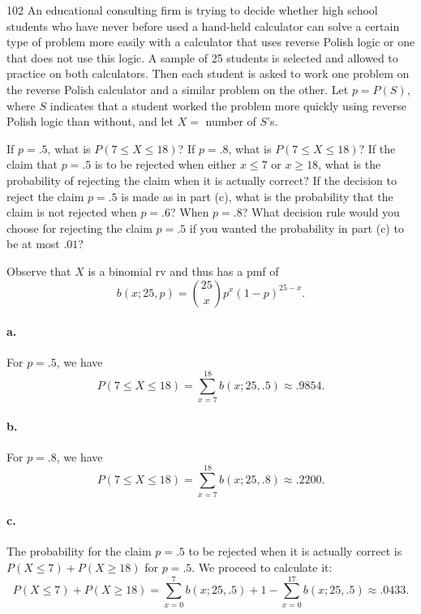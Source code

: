 \documentclass{exam}
\begin{document}
\begin{problem}{102}
	An educational consulting firm is trying to decide whether high school students who have never before used a hand-held calculator can solve a certain type of problem more easily with a calculator that uses reverse Polish logic or one that does not use this logic. A sample of 25 students is selected and allowed to practice on both calculators. Then each student is asked to work one problem on the reverse Polish calculator and a similar problem on the other. Let $p = P(S)$, where $S$ indicates that a student worked the problem more quickly using reverse Polish logic than without, and let $X =$ number of $S$'s.
	\begin{tasks}[label=\textbf{\alph*.}]
		\task If $p = .5$, what is $P(7 \le X \le 18)$?
		\task If $p = .8$, what is $P(7 \le X \le 18)$?
		\task If the claim that $p = .5$ is to be rejected when either $x \le 7$ or $x \ge 18$, what is the probability of rejecting the claim when it is actually correct?
		\task If the decision to reject the claim $p = .5$ is made as in part (c), what is the probability that the claim is not rejected when $p = .6$? When $p = .8$?
		\task What decision rule would you choose for rejecting the claim $p = .5$ if you wanted the probability in part (c) to be at most $.01$?
	\end{tasks}
\end{problem}

Observe that $X$ is a binomial rv and thus has a pmf of
\[
	b(x; 25, p) = \binom{25}x p^x (1 - p)^{25 - x}.
\]

\paragraph{a.} For $p = .5$, we have
\[
	P(7 \le X \le 18) = \sum_{x = 7}^{18} b(x; 25, .5) \approx .9854.
\]

\paragraph{b.} For $p = .8$, we have
\[
	P(7 \le X \le 18) = \sum_{x = 7}^{18} b(x; 25, .8) \approx .2200.
\]

\paragraph{c.} The probability for the claim $p = .5$ to be rejected when it is actually correct is $P(X \le 7) + P(X \ge 18)$ for $p = .5$. We proceed to calculate it:
\[
	P(X \le 7) + P(X \ge 18) = \sum_{x = 0}^7 b(x; 25, .5) + 1 - \sum_{x = 0}^{17} b(x; 25, .5) \approx .0433.
\]
\end{document}
